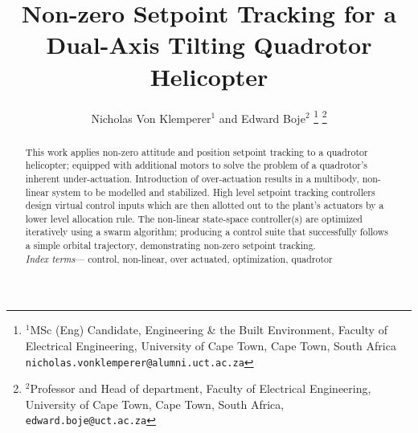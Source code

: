 \documentclass[a4paper, 10pt, conference]{ieeeconf}
\title{\LARGE \bf
Non-zero Setpoint Tracking for a Dual-Axis Tilting Quadrotor Helicopter
}
\author{Nicholas Von Klemperer$^{1}$ and Edward Boje$^{2}$%
\thanks{$^{1}$MSc (Eng) Candidate, Engineering \& the Built Environment, Faculty of Electrical Engineering, University of Cape Town, Cape Town, South Africa
{\tt\small nicholas.vonklemperer@alumni.uct.ac.za}}
\thanks{$^{2}$Professor and Head of department, Faculty of Electrical Engineering, University of Cape Town, Cape Town, South Africa,
        {\tt\small edward.boje@uct.ac.za}}%
}
\begin{document}
\maketitle
\thispagestyle{empty}
\pagestyle{empty}
\begin{abstract}
This work applies non-zero attitude and position setpoint tracking to a quadrotor helicopter; equipped with additional motors to solve the problem of a quadrotor's inherent under-actuation. Introduction of over-actuation results in a multibody, non-linear system to be modelled and stabilized. High level setpoint tracking controllers design virtual control inputs which are then allotted out to the plant's actuators by a lower level allocation rule. The non-linear state-space controller(s) are optimized iteratively using a swarm algorithm; producing a control suite that successfully follows a simple orbital trajectory, demonstrating non-zero setpoint tracking.
\\
\emph{Index terms}--- control, non-linear, over actuated, optimization, quadrotor
\end{abstract}
\end{document}
